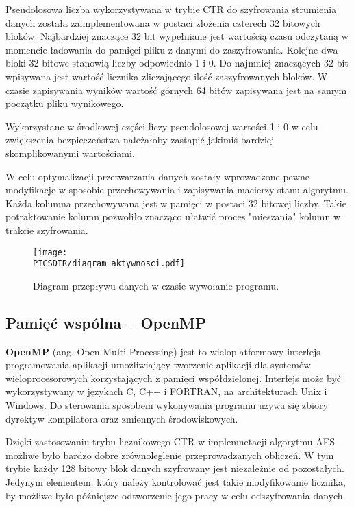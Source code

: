 \documentclass[a4paper,12pt]{article}
\def\PICSDIR{PICS}
\begin{document}
Pseudolosowa liczba wykorzystywana w trybie CTR do szyfrowania strumienia danych została zaimplementowana w postaci złożenia czterech 32 bitowych bloków. Najbardziej znaczące 32 bit wypełniane jest wartością czasu odczytaną w momencie ładowania do pamięci pliku z danymi do zaszyfrowania. Kolejne dwa bloki 32 bitowe stanowią liczby odpowiednio 1 i 0. Do najmniej znaczących 32 bit wpisywana jest wartość licznika zliczającego ilość zaszyfrowanych bloków. W czasie zapisywania wyników wartość górnych 64 bitów zapisywana jest na samym początku pliku wynikowego.

Wykorzystane w środkowej części liczy pseudolosowej wartości 1 i 0 w celu zwiększenia bezpieczeństwa należałoby zastąpić jakimiś bardziej skomplikowanymi wartościami.

W celu optymalizacji przetwarzania danych zostały wprowadzone pewne modyfikacje w sposobie przechowywania i zapisywania macierzy stanu algorytmu. Każda kolumna przechowywana jest w pamięci w postaci 32 bitowej liczby. Takie potraktowanie kolumn pozwoliło znacząco ułatwić proces "mieszania" kolumn w trakcie szyfrowania.

\begin{figure}
\centering
\texttt{[image: \\PICSDIR/diagram\_aktywnosci.pdf]}
\caption{Diagram przepływu danych w czasie wywołanie programu.}
\label{rys:da}
\end{figure}

\subsection{Pamięć wspólna -- OpenMP}
\textbf{OpenMP} (ang. Open Multi-Processing)  jest to wieloplatformowy interfejs programowania aplikacji umożliwiający tworzenie aplikacji dla systemów wieloprocesorowych korzystających z pamięci współdzielonej. Interfejs może być wykorzystywany w językach C, C++ i FORTRAN, na architekturach Unix i Windows. Do sterowania sposobem wykonywania programu używa się zbiory dyrektyw kompilatora oraz zmiennych środowiskowych.

Dzięki zastosowaniu trybu licznikowego CTR w implemnetacji algorytmu AES możliwe było bardzo dobre zrównoleglenie przeprowadzanych obliczeń. W tym trybie każdy 128 bitowy blok danych szyfrowany jest niezależnie od pozostałych. Jedynym elementem, który należy kontrolować jest takie modyfikowanie licznika, by możliwe było późniejsze odtworzenie jego pracy w celu odszyfrowania danych.
\end{document}

